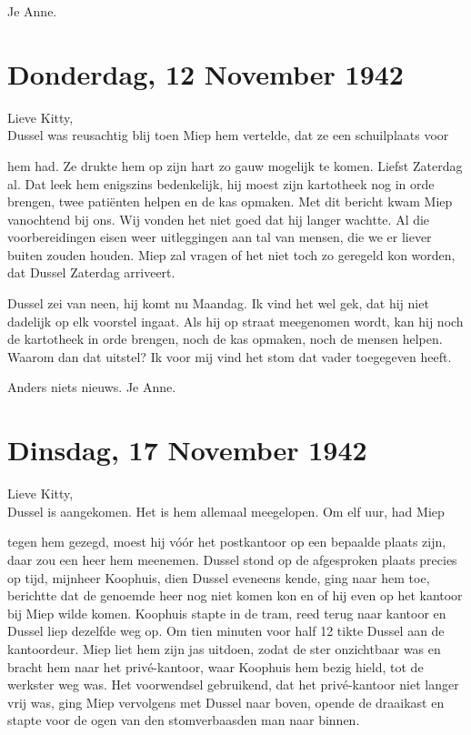 \documentclass{book}
\begin{document}
Je Anne.

\chapter{Donderdag, 12 November 1942}

Lieve Kitty,\\Dussel was reusachtig blij toen Miep hem vertelde, dat ze
een schuilplaats voor

hem had. Ze drukte hem op zijn hart zo gauw mogelijk te komen. Liefst
Zaterdag al. Dat leek hem enigszins bedenkelijk, hij moest zijn
kartotheek nog in orde brengen, twee patiënten helpen en de kas opmaken.
Met dit bericht kwam Miep vanochtend bij ons. Wij vonden het niet goed
dat hij langer wachtte. Al die voorbereidingen eisen weer uitleggingen
aan tal van mensen, die we er liever buiten zouden houden. Miep zal
vragen of het niet toch zo geregeld kon worden, dat Dussel Zaterdag
arriveert.

Dussel zei van neen, hij komt nu Maandag. Ik vind het wel gek, dat hij
niet dadelijk op elk voorstel ingaat. Als hij op straat meegenomen
wordt, kan hij noch de kartotheek in orde brengen, noch de kas opmaken,
noch de mensen helpen. Waarom dan dat uitstel? Ik voor mij vind het stom
dat vader toegegeven heeft.

Anders niets nieuws. Je Anne.

\chapter{Dinsdag, 17 November 1942}

Lieve Kitty,\\Dussel is aangekomen. Het is hem allemaal meegelopen. Om
elf uur, had Miep

tegen hem gezegd, moest hij vóór het postkantoor op een bepaalde plaats
zijn, daar zou een heer hem meenemen. Dussel stond op de afgesproken
plaats precies op tijd, mijnheer Koophuis, dien Dussel eveneens kende,
ging naar hem toe, berichtte dat de genoemde heer nog niet komen kon en
of hij even op het kantoor bij Miep wilde komen. Koophuis stapte in de
tram, reed terug naar kantoor en Dussel liep dezelfde weg op. Om tien
minuten voor half 12 tikte Dussel aan de kantoordeur. Miep liet hem zijn
jas uitdoen, zodat de ster onzichtbaar was en bracht hem naar het
privé-kantoor, waar Koophuis hem bezig hield, tot de werkster weg was.
Het voorwendsel gebruikend, dat het privé-kantoor niet langer vrij was,
ging Miep vervolgens met Dussel naar boven, opende de draaikast en
stapte voor de ogen van den stomverbaasden man naar binnen.
\end{document}
